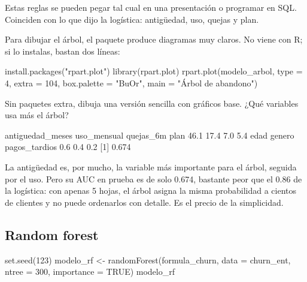 Estas reglas se pueden pegar tal cual en una presentación o programar en SQL.
Coinciden con lo que dijo la logística: antigüedad, uso, quejas y plan.

Para dibujar el árbol, el paquete  produce diagramas muy
claros. No viene con R; si lo instalas, bastan dos líneas:

\begin{rnoejecutar}
install.packages("rpart.plot")
library(rpart.plot)
rpart.plot(modelo_arbol, type = 4, extra = 104,
           box.palette = "BuOr", main = "Árbol de abandono")
\end{rnoejecutar}

Sin paquetes extra,  dibuja
una versión sencilla con gráficos base. ¿Qué variables usa más el árbol?


\begin{rsalida}
antiguedad_meses      uso_mensual        quejas_6m             plan 
            46.1             17.4              7.0              5.4 
            edad           genero    pagos_tardios 
             0.6              0.4              0.2 
[1] 0.674
\end{rsalida}

La antigüedad es, por mucho, la variable más importante para el árbol,
seguida por el uso. Pero su AUC en prueba es de solo 0.674, bastante peor que
el 0.86 de la logística: con apenas 5 hojas, el árbol asigna la misma
probabilidad a cientos de clientes y no puede ordenarlos con detalle. Es el
precio de la simplicidad.

\subsection{Random forest}

\begin{rcode}
set.seed(123)
modelo_rf <- randomForest(formula_churn, data = churn_ent,
                          ntree = 300, importance = TRUE)
modelo_rf
\end{rcode}

